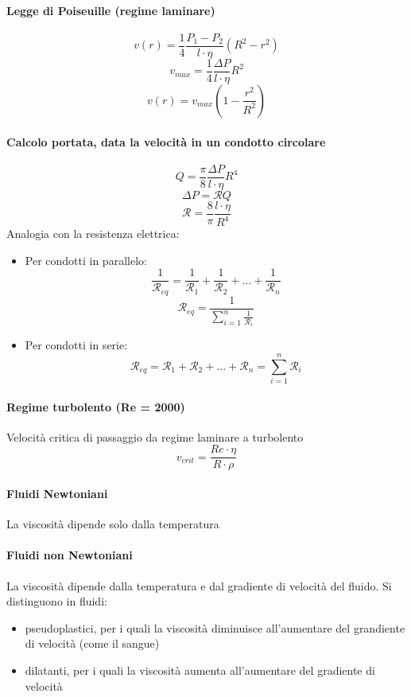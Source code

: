 \documentclass[12pt]{article}
\begin{document}
        \paragraph*{Legge di Poiseuille (regime laminare)}
        \[v(r) = \frac{1}{4}\frac{P_1 - P_2}{l \cdot \eta}(R^2 - r^2)\]
        \[v_{max} = \frac{1}{4}\frac{\Delta P}{l \cdot \eta}R^2\]
        \[v(r) = v_{max}(1-\frac{r^2}{R^2})\]
        \paragraph*{Calcolo portata, data la velocità in un condotto circolare}
        \[Q = \frac{\pi}{8}\frac{\Delta P}{l \cdot \eta}R^4\]
        \[\Delta P = \mathcal{R}Q\]
        \[\mathcal{R} = \frac{8}{\pi}\frac{l \cdot \eta}{R^4}\]
        Analogia con la resistenza elettrica:
        \begin{itemize}
            \item Per condotti in parallelo: \[\frac{1}{\mathcal{R}_{eq}} = \frac{1}{\mathcal{R}_{1}} + \frac{1}{\mathcal{R}_{2}} + ... + \frac{1}{\mathcal{R}_{n}}\]
            \[\mathcal{R}_{eq} = \frac{1}{\sum_{i = 1}^{n}{\frac{1}{\mathcal{R}_i}}}\]
            \item Per condotti in serie: \[\mathcal{R}_{eq} = \mathcal{R}_1 + \mathcal{R}_2 + ... + \mathcal{R}_n = \sum_{i = 1}^{n}{\mathcal{R}_i}\]
        \end{itemize}
        \paragraph*{Regime turbolento (Re = 2000)}
        Velocità critica di passaggio da regime laminare a turbolento
        \[v_{crit} = \frac{Re \cdot \eta}{R \cdot \rho}\]
        \paragraph*{Fluidi Newtoniani}
        La viscosità dipende solo dalla temperatura
        \paragraph*{Fluidi non Newtoniani}
        La viscosità dipende dalla temperatura e dal gradiente di velocità del fluido.
        Si distinguono in fluidi:
        \begin{itemize}
            \item pseudoplastici, per i quali la viscosità diminuisce all'aumentare del grandiente di velocità (come il sangue)
            \item dilatanti, per i quali la viscosità aumenta all'aumentare del gradiente di velocità
        \end{itemize}
\end{document}
